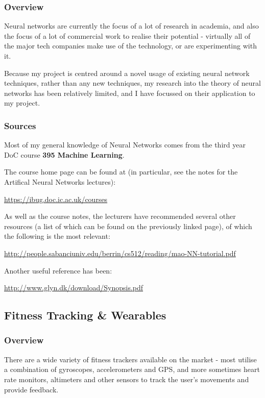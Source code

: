 \documentclass[a4paper]{article}
\begin{document}
\subsubsection{Overview}

Neural networks are currently the focus of a lot of research in academia, and also the focus of a lot of commercial work to realise their potential - virtually all of the major tech companies make use of the technology, or are experimenting with it.

Because my project is centred around a novel usage of existing neural network techniques, rather than any new techniques, my research into the theory of neural networks has been relatively limited, and I have focussed on their application to my project.

\subsubsection{Sources}

Most of my general knowledge of Neural Networks comes from the third year DoC course \textbf{395 Machine Learning}.

The course home page can be found at (in particular, see the notes for the Artifical Neural Networks lectures):

\url{https://ibug.doc.ic.ac.uk/courses}

As well as the course notes, the lecturers have recommended several other resources (a list of which can be found on the previously linked page), of which the following is the most relevant:

\url{http://people.sabanciuniv.edu/berrin/cs512/reading/mao-NN-tutorial.pdf}

Another useful reference has been:

\url{http://www.glyn.dk/download/Synopsis.pdf}

\subsection{Fitness Tracking \& Wearables}%

\subsubsection{Overview}

There are a wide variety of fitness trackers available on the market - most utilise a combination of gyroscopes, accelerometers and GPS, and more sometimes heart rate monitors, altimeters and other sensors to track the user's movements and provide feedback.
\end{document}

